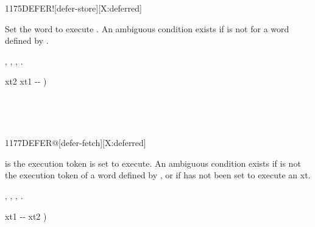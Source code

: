 \begin{worddef}{1175}{DEFER!}[defer-store][X:deferred]
\item {}

	Set the word  to execute .  An ambiguous
	condition exists if  is not for a word defined by
	.

\see {},
	,
	,
	.

	\begin{implement} %
		\word{:}   xt2 xt1 -{}- ) \\
		\tab {} \word{!} \word{;}
	\end{implement}

	\begin{testing} %

		 \\

		 \\
	\end{testing}
\end{worddef}


\begin{worddef}{1177}{DEFER@}[defer-fetch][X:deferred]
\item {}

	 is the execution token  is set to execute.
	An ambiguous condition exists if  is not
	the execution token of a word defined by ,
	or if  has not been set to execute an xt. 

\see {},
	,
	,
	.

	\begin{implement} %
		\word{:}   xt1 -{}- xt2 ) \\
		\tab {}  \word{;}
	\end{implement}

	\begin{testing} %

		 \\
		 \\

		 \\
		 \\
	\end{testing}
\end{worddef}


